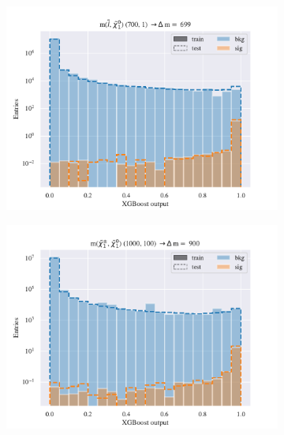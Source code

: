 \begin{figure}[H]
    \centering
    \begin{subfigure}[t!]{0.49\textwidth}
        \includegraphics[width = \textwidth]{Figures/SlepSlep/ML/BDT/High_level/High/scaled_train_test_396033.pdf}
        \caption{}
        \label{fig:traintestscaled}
    \end{subfigure}
    \begin{subfigure}[t!]{0.49\textwidth}
        \includegraphics[width = \textwidth]{Figures/SlepSnu/BDT/Low_level/High/scaled_train_test_397169.pdf}
        \caption{}
        \label{fig:ROCBDTLow_low_level}
    \end{subfigure}
    \begin{subfigure}[t!]{0.49\textwidth}

\end{subfigure}
\end{figure}
